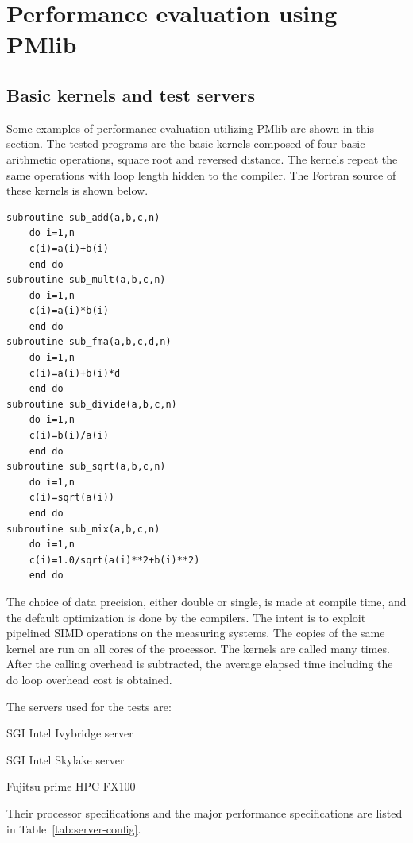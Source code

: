 \documentclass[conference]{IEEEtran}
\begin{document}
\section{Performance evaluation using PMlib}
\label{section:using-PMlib}

\subsection{Basic kernels and test servers}
\label{subsection:basic-kernels}

Some examples of performance evaluation utilizing PMlib are shown in this section.
The tested programs are the basic kernels composed of
four basic arithmetic operations, square root and reversed distance.
The kernels repeat the same operations with loop length hidden to the compiler.
%
The Fortran source of these kernels is shown below.
\begin{lstlisting}
subroutine sub_add(a,b,c,n)
	do i=1,n
	c(i)=a(i)+b(i)
	end do
subroutine sub_mult(a,b,c,n)
	do i=1,n
	c(i)=a(i)*b(i)
	end do
subroutine sub_fma(a,b,c,d,n)
	do i=1,n
	c(i)=a(i)+b(i)*d
	end do
subroutine sub_divide(a,b,c,n)
	do i=1,n
	c(i)=b(i)/a(i)
	end do
subroutine sub_sqrt(a,b,c,n)
	do i=1,n
	c(i)=sqrt(a(i))
	end do
subroutine sub_mix(a,b,c,n)
	do i=1,n
	c(i)=1.0/sqrt(a(i)**2+b(i)**2)
	end do
\end{lstlisting}

The choice of data precision, either double or single, is made at compile time,
and the default optimization is done by the compilers.
The intent is to exploit pipelined SIMD operations on the measuring systems.
The copies of the same kernel are run on all cores of the processor.
The kernels are called many times.  After the calling overhead is subtracted,
the average elapsed time including the do loop overhead cost is obtained.


The servers used for the tests are:
\begin{itemize}
{
\item SGI Intel Ivybridge server
\item SGI Intel Skylake server
\item Fujitsu prime HPC FX100
}
\end{itemize}
Their processor specifications and the major performance specifications
are listed in Table~\ref{tab:server-config}.
\end{document}
